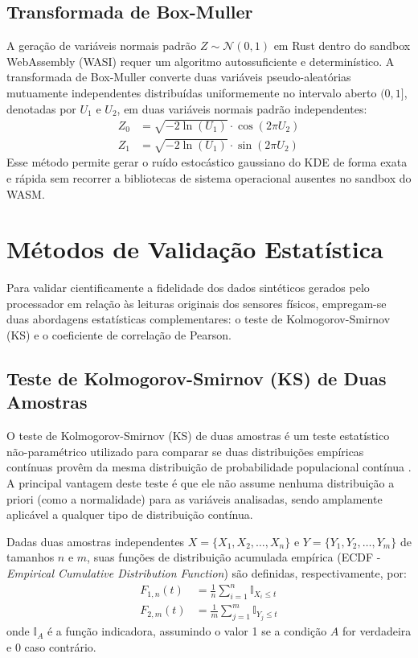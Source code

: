\documentclass[
	12pt,
	openright,
	oneside,
	a4paper,
	english,
	brazil
	]{abntex2}
\begin{document}
\subsection{Transformada de Box-Muller}

A geração de variáveis normais padrão $Z \sim \mathcal{N}(0,1)$ em Rust dentro do sandbox WebAssembly (WASI) requer um algoritmo autossuficiente e determinístico. A transformada de Box-Muller \cite{box1958muller} converte duas variáveis pseudo-aleatórias mutuamente independentes distribuídas uniformemente no intervalo aberto $(0, 1]$, denotadas por $U_1$ e $U_2$, em duas variáveis normais padrão independentes:
\begin{align}
Z_0 &= \sqrt{-2 \ln(U_1)} \cdot \cos(2\pi U_2) \\
Z_1 &= \sqrt{-2 \ln(U_1)} \cdot \sin(2\pi U_2)
\end{align}
Esse método permite gerar o ruído estocástico gaussiano do KDE de forma exata e rápida sem recorrer a bibliotecas de sistema operacional ausentes no sandbox do WASM.

\section{Métodos de Validação Estatística}

Para validar cientificamente a fidelidade dos dados sintéticos gerados pelo processador em relação às leituras originais dos sensores físicos, empregam-se duas abordagens estatísticas complementares: o teste de Kolmogorov-Smirnov (KS) e o coeficiente de correlação de Pearson.

\subsection{Teste de Kolmogorov-Smirnov (KS) de Duas Amostras}

O teste de Kolmogorov-Smirnov (KS) de duas amostras é um teste estatístico não-paramétrico utilizado para comparar se duas distribuições empíricas contínuas provêm da mesma distribuição de probabilidade populacional contínua \cite{massey1951ks}. A principal vantagem deste teste é que ele não assume nenhuma distribuição a priori (como a normalidade) para as variáveis analisadas, sendo amplamente aplicável a qualquer tipo de distribuição contínua.

Dadas duas amostras independentes $X = \{X_1, X_2, \dots, X_n\}$ e $Y = \{Y_1, Y_2, \dots, Y_m\}$ de tamanhos $n$ e $m$, suas funções de distribuição acumulada empírica (ECDF - \textit{Empirical Cumulative Distribution Function}) são definidas, respectivamente, por:
\begin{align}
F_{1,n}(t) &= \frac{1}{n} \sum_{i=1}^n \mathbb{I}_{X_i \leq t} \\
F_{2,m}(t) &= \frac{1}{m} \sum_{j=1}^m \mathbb{I}_{Y_j \leq t}
\end{align}
onde $\mathbb{I}_{A}$ é a função indicadora, assumindo o valor 1 se a condição $A$ for verdadeira e 0 caso contrário.
\end{document}

